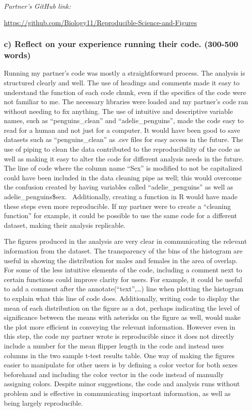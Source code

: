 \documentclass[
]{article}
\begin{document}
\emph{Partner's GitHub link:}

\url{https://github.com/Biology11/Reproducible-Science-and-Figures}

\subsubsection{c) Reflect on your experience running their code.
(300-500
words)}\label{c-reflect-on-your-experience-running-their-code.-300-500-words}

Running my partner's code was mostly a straightforward process. The
analysis is structured clearly and well. The use of headings and
comments made it easy to understand the function of each code chunk,
even if the specifics of the code were not familiar to me. The necessary
libraries were loaded and my partner's code ran without needing to fix
anything. The use of intuitive and descriptive variable names, such as
``penguins\_clean'' and ``adelie\_penguins'', made the code easy to read
for a human and not just for a computer. It would have been good to save
datasets such as ``penguins\_clean'' as .csv files for easy access in
the future. The use of piping to clean the data contributed to the
reproducibility of the code as well as making it easy to alter the code
for different analysis needs in the future. The line of code where the
column name ``Sex'' is modified to not be capitalized could have been
included in the data cleaning pipe as well; this would overcome the
confusion created by having variables called ``adelie\_penguins'' as
well as adelie\_penguins\$sex.~ Additionally, creating a function in R
would have made these steps even more reproducible. If my partner were
to create a ``cleaning function'' for example, it could be possible to
use the same code for a different dataset, making their analysis
replicable.~

The figures produced in the analysis are very clear in communicating the
relevant information from the dataset. The transparency of the bins of
the histogram are useful in showing the distribution for males and
females in the area of overlap. For some of the less intuitive elements
of the code, including a comment next to certain functions could improve
clarity for users. For example, it could be useful to add a comment
after the annotate(``text'',\ldots) line when plotting the histogram to
explain what this line of code does. Additionally, writing code to
display the mean of each distribution on the figure as a dot, perhaps
indicating the level of significance between the means with asterisks on
the figure as well, would make the plot more efficient in conveying the
relevant information. However even in this step, the code my partner
wrote is reproducible since it does not directly include a number for
the mean flipper length in the code and instead uses columns in the two
sample t-test results table. One way of making the figures easier to
manipulate for other users is by defining a color vector for both sexes
beforehand and including the color vector in the code instead of
manually assigning colors. Despite minor suggestions, the code and
analysis runs without problem and is effective in communicating
important information, as well as being largely reproducible.
\end{document}
